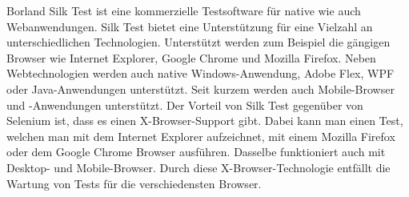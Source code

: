 Borland Silk Test ist eine kommerzielle Testsoftware für native wie auch Webanwendungen. Silk Test bietet eine Unterstützung für eine Vielzahl an unterschiedlichen Technologien. Unterstützt werden zum Beispiel die gängigen Browser wie Internet Explorer, Google Chrome und Mozilla Firefox. Neben Webtechnologien werden auch native Windows-Anwendung, Adobe Flex, WPF oder Java-Anwendungen unterstützt. Seit kurzem werden auch Mobile-Browser und -Anwendungen unterstützt. Der Vorteil von Silk Test gegenüber von Selenium ist, dass es einen X-Browser-Support gibt. Dabei kann man einen Test, welchen man mit dem Internet Explorer aufzeichnet, mit einem Mozilla Firefox oder dem Google Chrome Browser ausführen. Dasselbe funktioniert auch mit Desktop- und Mobile-Browser. Durch diese X-Browser-Technologie entfällt die Wartung von Tests für die verschiedensten Browser. 
